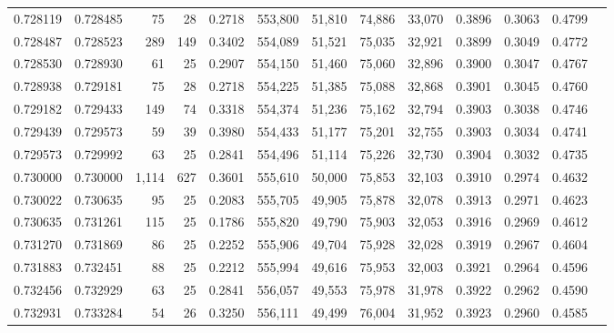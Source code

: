 \begin{tabular}{rrrrrrrrrrrrr}
0.728119 & 0.728485 &    75 &  28 &                                     0.2718 & 553,800 &  51,810 &  74,886 &  33,070 & 0.3896 & 0.3063 & 0.4799 \\
0.728487 & 0.728523 &   289 & 149 &                                     0.3402 & 554,089 &  51,521 &  75,035 &  32,921 & 0.3899 & 0.3049 & 0.4772 \\
0.728530 & 0.728930 &    61 &  25 &                                     0.2907 & 554,150 &  51,460 &  75,060 &  32,896 & 0.3900 & 0.3047 & 0.4767 \\
0.728938 & 0.729181 &    75 &  28 &                                     0.2718 & 554,225 &  51,385 &  75,088 &  32,868 & 0.3901 & 0.3045 & 0.4760 \\
0.729182 & 0.729433 &   149 &  74 &                                     0.3318 & 554,374 &  51,236 &  75,162 &  32,794 & 0.3903 & 0.3038 & 0.4746 \\
0.729439 & 0.729573 &    59 &  39 &                                     0.3980 & 554,433 &  51,177 &  75,201 &  32,755 & 0.3903 & 0.3034 & 0.4741 \\
0.729573 & 0.729992 &    63 &  25 &                                     0.2841 & 554,496 &  51,114 &  75,226 &  32,730 & 0.3904 & 0.3032 & 0.4735 \\
0.730000 & 0.730000 & 1,114 & 627 &                                     0.3601 & 555,610 &  50,000 &  75,853 &  32,103 & 0.3910 & 0.2974 & 0.4632 \\
0.730022 & 0.730635 &    95 &  25 &                                     0.2083 & 555,705 &  49,905 &  75,878 &  32,078 & 0.3913 & 0.2971 & 0.4623 \\
0.730635 & 0.731261 &   115 &  25 &                                     0.1786 & 555,820 &  49,790 &  75,903 &  32,053 & 0.3916 & 0.2969 & 0.4612 \\
0.731270 & 0.731869 &    86 &  25 &                                     0.2252 & 555,906 &  49,704 &  75,928 &  32,028 & 0.3919 & 0.2967 & 0.4604 \\
0.731883 & 0.732451 &    88 &  25 &                                     0.2212 & 555,994 &  49,616 &  75,953 &  32,003 & 0.3921 & 0.2964 & 0.4596 \\
0.732456 & 0.732929 &    63 &  25 &                                     0.2841 & 556,057 &  49,553 &  75,978 &  31,978 & 0.3922 & 0.2962 & 0.4590 \\
0.732931 & 0.733284 &    54 &  26 &                                     0.3250 & 556,111 &  49,499 &  76,004 &  31,952 & 0.3923 & 0.2960 & 0.4585 \\

\end{tabular}
